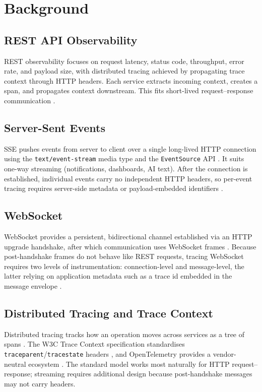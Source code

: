 \documentclass[11pt]{article}
\begin{document}
\section{Background}

\subsection{REST API Observability}
REST observability focuses on request latency, status code, throughput, error rate, and payload size, with distributed tracing achieved by propagating trace context through HTTP headers. Each service extracts incoming context, creates a span, and propagates context downstream. This fits short-lived request--response communication \cite{w3ctrace,dapper2010}.

\subsection{Server-Sent Events}
SSE pushes events from server to client over a single long-lived HTTP connection using the \texttt{text/event-stream} media type and the \texttt{EventSource} API \cite{whatwgsse}. It suits one-way streaming (notifications, dashboards, AI text). After the connection is established, individual events carry no independent HTTP headers, so per-event tracing requires server-side metadata or payload-embedded identifiers \cite{oneuptimesse2026}.

\subsection{WebSocket}
WebSocket provides a persistent, bidirectional channel established via an HTTP upgrade handshake, after which communication uses WebSocket frames \cite{rfc6455}. Because post-handshake frames do not behave like REST requests, tracing WebSocket requires two levels of instrumentation: connection-level and message-level, the latter relying on application metadata such as a trace id embedded in the message envelope \cite{alibabaws2026,splunkws2023}.

\subsection{Distributed Tracing and Trace Context}
Distributed tracing tracks how an operation moves across services as a tree of spans \cite{dapper2010}. The W3C Trace Context specification standardises \texttt{traceparent}\slash\texttt{tracestate} headers \cite{w3ctrace}, and OpenTelemetry provides a vendor-neutral ecosystem \cite{oteldocs}. The standard model works most naturally for HTTP request--response; streaming requires additional design because post-handshake messages may not carry headers.
\end{document}
